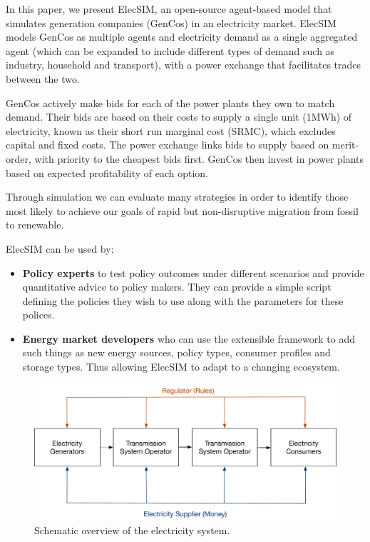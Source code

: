 In this paper, we present ElecSIM, an open-source agent-based model that simulates generation companies (GenCos) in an electricity market. ElecSIM models GenCos as multiple agents and electricity demand as a single aggregated agent (which can be expanded to include different types of demand such as industry, household and transport), with a power exchange that facilitates trades between the two. 

GenCos actively make bids for each of the power plants they own to match demand. Their bids are based on their costs to supply a single unit (1MWh) of electricity, known as their short run marginal cost (SRMC), which excludes capital and fixed costs. The power exchange links bids to supply based on merit-order, with priority to the cheapest bids first. GenCos then invest in power plants based on expected profitability of each option.


Through simulation we can evaluate many strategies in order to identify those most likely to achieve our goals of rapid but non-disruptive migration from fossil to renewable.






ElecSIM can be used by:
\begin{itemize}
	\item {\bf Policy experts} to test policy outcomes under different scenarios and provide quantitative advice to policy makers. They can provide a simple script defining the policies they wish to use along with the parameters for these polices.
	\item {\bf Energy market developers} who can use the extensible framework to add such things as new energy sources, policy types, consumer profiles and storage types. Thus allowing ElecSIM to adapt to a changing ecosystem.
\end{itemize}


\begin{figure}
	\centering
	\includegraphics[width=0.9\linewidth]{figures/main_electricty_players}
	\caption{Schematic overview of the electricity system.}
	\label{fig:mainelectrictyplayers}
\end{figure}



